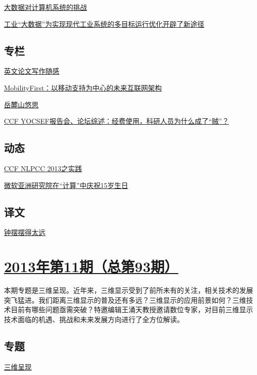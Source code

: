 \documentclass[a4paper]{article}
\begin{document}
\href{http://history.ccf.org.cn/resources/1190201776262/2013/12/16/7.pdf}{大数据对计算机系统的挑战}

\href{http://history.ccf.org.cn/resources/1190201776262/2013/12/16/8.pdf}{工业“大数据”为实现现代工业系统的多目标运行优化开辟了新途径}

\subsection{专栏}
\href{http://history.ccf.org.cn/resources/1190201776262/2013/12/16/10.pdf}{英文论文写作随感}

\href{http://history.ccf.org.cn/resources/1190201776262/2013/12/16/11.pdf}{MobilityFirst：以移动支持为中心的未来互联网架构}

\href{http://history.ccf.org.cn/resources/1190201776262/2013/12/16/12.pdf}{岳麓山悠思}

\href{http://history.ccf.org.cn/resources/1190201776262/2013/12/16/13.pdf}{CCF YOCSEF报告会、论坛综述：经费使用，科研人员为什么成了“贼”？}

\subsection{动态}
\href{http://history.ccf.org.cn/resources/1190201776262/2013/12/16/14.pdf}{CCF NLPCC 2013之实践}

\href{http://history.ccf.org.cn/resources/1190201776262/2013/12/16/15.pdf}{微软亚洲研究院在“计算”中庆祝15岁生日}

\subsection{译文}
\href{http://history.ccf.org.cn/resources/1190201776262/2013/12/16/16.pdf}{钟摆摆得太远}


\section{\href{http://history.ccf.org.cn/sites/ccf/jsjtbbd.jsp?contentId=2768636233516}{\textbf{2013年第11期（总第93期）}}}
本期专题是三维呈现。近年来，三维显示受到了前所未有的关注，相关技术的发展突飞猛进。我们距离三维显示的普及还有多远？三维显示的应用前景如何？三维技术目前有哪些问题亟需突破？特邀编辑王涌天教授邀请数位专家，对目前三维显示技术面临的机遇、挑战和未来发展方向进行了全方位解读。
\subsection{专题}
\href{http://history.ccf.org.cn/resources/1190201776262/2013/11/15/0.pdf}{三维呈现}
\end{document}
